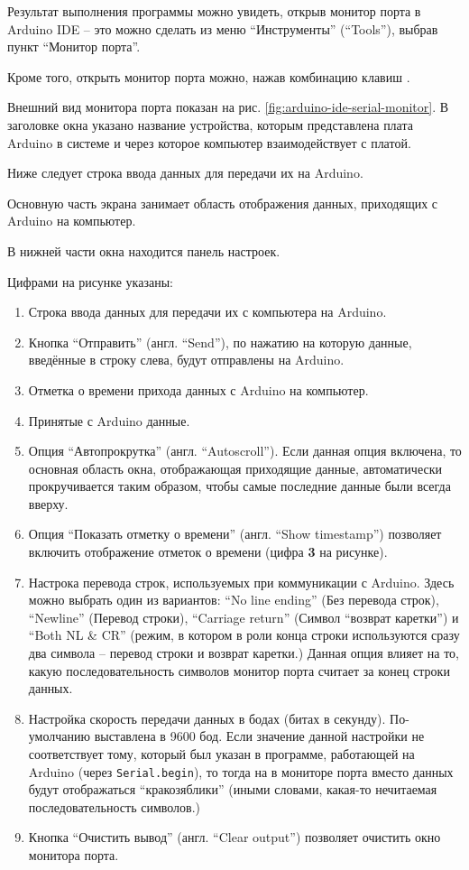 \documentclass[../sparc.tex]{subfiles}
\begin{document}
Результат выполнения программы можно увидеть, открыв монитор порта в Arduino IDE
-- это можно сделать из меню ``Инструменты'' (``Tools''), выбрав пункт ``Монитор
порта''.

Кроме того, открыть монитор порта можно, нажав комбинацию клавиш .

Внешний вид монитора порта показан на рис. \ref{fig:arduino-ide-serial-monitor}.
В заголовке окна указано название устройства, которым представлена плата Arduino
в системе и через которое компьютер взаимодействует с платой.

Ниже следует строка ввода данных для передачи их на Arduino.

Основную часть экрана занимает область отображения данных, приходящих с Arduino
на компьютер.

В нижней части окна находится панель настроек.

Цифрами на рисунке указаны:
\begin{enumerate}
\item Строка ввода данных для передачи их с компьютера на Arduino.
\item Кнопка ``Отправить'' (англ. ``Send''), по нажатию на которую данные,
  введённые в строку слева, будут отправлены на Arduino.
\item Отметка о времени прихода данных с Arduino на компьютер.
\item Принятые с Arduino данные.
\item Опция ``Автопрокрутка'' (англ. ``Autoscroll'').  Если данная опция
  включена, то основная область окна, отображающая приходящие данные,
  автоматически прокручивается таким образом, чтобы самые последние данные были
  всегда вверху.
\item Опция ``Показать отметку о времени'' (англ. ``Show timestamp'') позволяет
  включить отображение отметок о времени (цифра \textbf{3} на рисунке).
\item Настрока перевода строк, используемых при коммуникации с Arduino.  Здесь
  можно выбрать один из вариантов: ``No line ending'' (Без перевода строк),
  ``Newline'' (Перевод строки), ``Carriage return'' (Символ ``возврат каретки'')
  и ``Both NL & CR'' (режим, в котором в роли конца строки используются сразу
  два символа -- перевод строки и возврат каретки.)  Данная опция влияет на то,
  какую последовательность символов монитор порта считает за конец строки
  данных.
\item Настройка скорость передачи данных в бодах (битах в секунду).
  По-умолчанию выставлена в 9600 бод.  Если значение данной настройки не
  соответствует тому, который был указан в программе, работающей на Arduino
  (через \texttt{Serial.begin}), то тогда на в мониторе порта вместо данных
  будут отображаться ``кракозяблики'' (иными словами, какая-то нечитаемая
  последовательность символов.)
\item Кнопка ``Очистить вывод'' (англ. ``Clear output'') позволяет очистить окно
  монитора порта.
\end{enumerate}
\end{document}
